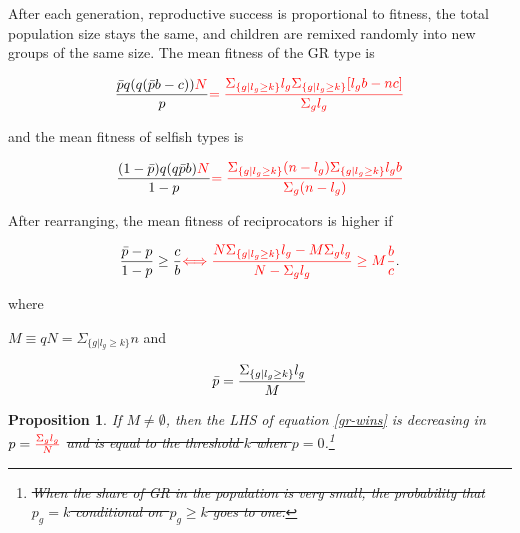 \documentclass[12pt,a4paper]{article}
\newtheorem{prop}[theo]{Proposition}
\newcommand{\mm}[1]{{\color{red} #1}}
\begin{document}
After each generation, reproductive success is proportional to fitness, the total population size stays the same, and children are remixed randomly into new groups of the same size.
%
The mean fitness of the GR type is

\begin{equation*}
\frac{
  \bpi q(q(\bpi b - c))\mm{N}
}{
  p
}
\mm{=\frac{\Sigma_{\{g|l_g \geq k\}}l_g \Sigma_{\{g|l_g \geq k\}}[l_gb-nc]}{\Sigma_gl_g}}
\end{equation*}

and the mean fitness of selfish types is

\begin{equation*}
\frac{
  (1 - \bpi)q(q\bpi b)\mm{N}
}{
  1 - p
}
\mm{=\frac{\Sigma_{\{g|l_g \geq k\}}(n-l_g) \Sigma_{\{g|l_g \geq k\}}l_gb}{\Sigma_g(n-l_g)}}
\end{equation*}

After rearranging, the mean fitness of reciprocators is higher if


\begin{equation}
\label{gr-wins}
\frac{ \bpi - p}{ 1 - p} \ge \frac{c}{b}
\mm{\Longleftrightarrow \frac{N\Sigma_{\{g|l_g \geq k\}}l_g-M\Sigma_gl_g}{N-\Sigma_gl_g} \ge M\frac{b}{c}}.
\end{equation}

where \mm{$M \equiv qN=\Sigma_{\{g|l_g \geq k\}}n$ and 

\[
\bar{p} = \frac{\Sigma_{\{g|l_g \geq k\}}l_g}{M}
\]}

\begin{prop}
\label{prop:decrease_in_p}
    \mm{If $M \neq \emptyset$, then} the LHS of equation \eqref{gr-wins} is decreasing in $p=\mm{\frac{\Sigma_gl_g}{N}}$ \sout{and is equal
to the threshold $k$ when $p = 0$}.\footnote{\sout{
    When the share of GR in the population is very small, the probability that $p_g = k$ conditional on~$p_g\geq k$ goes to one.
}}
\end{prop}
\end{document}
